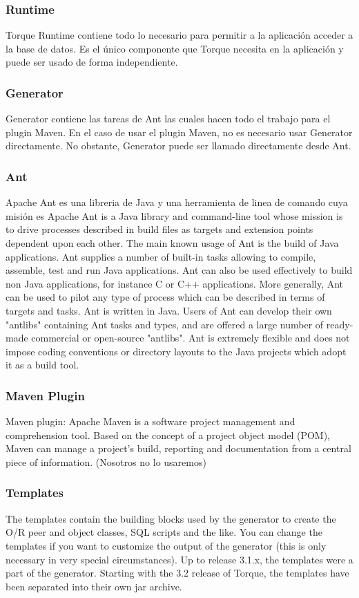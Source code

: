 \documentclass[12pt, oneside]{article}
\begin{document}
\subsubsection{Runtime}
Torque Runtime contiene todo lo necesario para permitir a la aplicación acceder a la base de datos. Es el único componente que Torque necesita en la aplicación y puede ser usado de forma independiente.

\subsubsection{Generator}
Generator contiene las tareas de Ant las cuales hacen todo el trabajo para el plugin Maven. En el caso de usar el plugin Maven, no es necesario usar Generator directamente. No obstante, Generator puede ser llamado directamente desde Ant.

\subsubsection{Ant}
Apache Ant es una libreria de Java y una herramienta de linea de comando cuya misión es
Apache Ant is a Java library and command-line tool whose mission is to drive processes described in build files as targets and extension points dependent upon each other. The main known usage of Ant is the build of Java applications. Ant supplies a number of built-in tasks allowing to compile, assemble, test and run Java applications. Ant can also be used effectively to build non Java applications, for instance C or C++ applications. More generally, Ant can be used to pilot any type of process which can be described in terms of targets and tasks. Ant is written in Java. Users of Ant can develop their own "antlibs" containing Ant tasks and types, and are offered a large number of ready-made commercial or open-source "antlibs". Ant is extremely flexible and does not impose coding conventions or directory layouts to the Java projects which adopt it as a build tool.

\subsubsection{Maven Plugin}
Maven plugin: Apache Maven is a software project management and comprehension tool. Based on the concept of a project object model (POM), Maven can manage a project's build, reporting and documentation from a central piece of information. (Nosotros no lo usaremos)

\subsubsection{Templates}
The templates contain the building blocks used by the generator to create the O/R peer and object classes, SQL scripts and the like. You can change the templates if you want to customize the output of the generator (this is only necessary in very special circumstances). Up to release 3.1.x, the templates were a part of the generator. Starting with the 3.2 release of Torque, the templates have been separated into their own jar archive.
\end{document}
